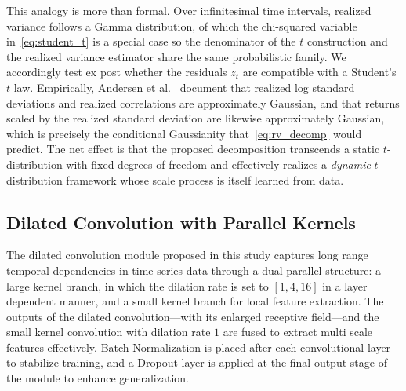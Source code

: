 \documentclass[sigconf,natbib=false]{acmart}
\begin{document}
This analogy is more than formal. Over infinitesimal time intervals, realized variance follows a Gamma distribution, of which the chi-squared variable in~\eqref{eq:student_t} is a special case so the denominator of the $t$ construction and the realized variance estimator share the same probabilistic family. We accordingly test ex post whether the residuals $z_t$ are compatible with a Student's $t$ law. Empirically, Andersen et al.~\cite{andersen2001distribution} document that realized log standard deviations and realized correlations are approximately Gaussian, and that returns scaled by the realized standard deviation are likewise approximately Gaussian, which is precisely the conditional Gaussianity that~\eqref{eq:rv_decomp} would predict. The net effect is that the proposed decomposition transcends a static $t$-distribution with fixed degrees of freedom and effectively realizes a \emph{dynamic} $t$-distribution framework whose scale process is itself learned from data.


\subsection{Dilated Convolution with Parallel Kernels}

The dilated convolution module proposed in this study captures long range temporal dependencies in time series data through a dual parallel structure: a large kernel branch, in which the dilation rate is set to $[1, 4, 16]$ in a layer dependent manner, and a small kernel branch for local feature extraction. The outputs of the dilated convolution---with its enlarged receptive field---and the small kernel convolution with dilation rate $1$ are fused to extract multi scale features effectively. Batch Normalization is placed after each convolutional layer to stabilize training, and a Dropout layer is applied at the final output stage of the module to enhance generalization.
\end{document}
